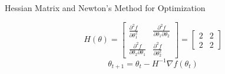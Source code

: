 \documentclass[serif, aspectratio=169]{beamer}
\begin{document}
\begin{frame}{Hessian Matrix and Newton's Method for Optimization}
\begin{minipage}{0.5\linewidth}
        \[
        H(\theta) = 
        \begin{bmatrix}
            \frac{\partial^2 f}{\partial \theta_1^2} & \frac{\partial^2 f}{\partial \theta_1 \partial \theta_2} \\
            \frac{\partial^2 f}{\partial \theta_2 \partial \theta_1} & \frac{\partial^2 f}{\partial \theta_2^2}
        \end{bmatrix} =
        \begin{bmatrix}
            2 & 2 \\
            2 & 2
        \end{bmatrix}
        \]
        \[
        \theta_{t+1} = \theta_t - H^{-1} \nabla f(\theta_t)
        \]
\end{minipage}
\end{frame}
\end{document}
